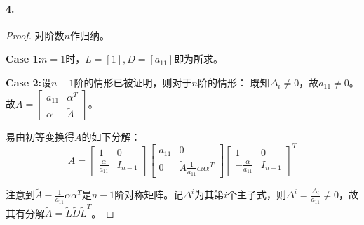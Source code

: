 \documentclass{ctexart}
\begin{document}
\paragraph{4.}
\begin{proof}
对阶数$n$作归纳。

\textbf{Case 1:}$n=1$时，$L=[1], D=[a_{11}]$即为所求。

\textbf{Case 2:}设$n-1$阶的情形已被证明，则对于$n$阶的情形：
既知$\Delta_i\neq 0$，故$a_{11}\neq 0$。故$A=\begin{bmatrix}a_{11}&\alpha^T\\ \alpha&\tilde{A}\end{bmatrix}$。

易由初等变换得$A$的如下分解：
\[A=\begin{bmatrix}1&0\\\frac{\alpha}{a_{11}}&I_{n-1}\end{bmatrix}\begin{bmatrix}a_{11}&0\\0&\tilde{A}\frac{1}{a_{11}}\alpha\alpha^T \end{bmatrix}\begin{bmatrix}1&0\\-\frac{\alpha}{a_{11}}&I_{n-1}\end{bmatrix}^T\]

注意到$\tilde{A}-\frac{1}{a_{11}}\alpha\alpha^T$是$n-1$阶对称矩阵。记$\Delta^i$为其第$i$个主子式，则$\Delta^i=\frac{\Delta_i}{a_{11}}\neq 0$，故其有分解$\tilde{A}=\tilde{L}\tilde{D}\tilde{L}^T$。


\end{proof}
\end{document}
